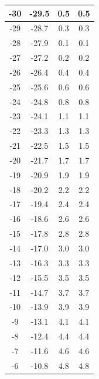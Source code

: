 \begin{longtable}{|c|c|c|c|}
                -30 & -29.5 & 0.5 & 0.5 \\
                \hline
                -29 & -28.7 & 0.3 & 0.3 \\
                \hline
                -28 & -27.9 & 0.1 & 0.1 \\
                \hline
                -27 & -27.2 & 0.2 & 0.2 \\
                \hline
                -26 & -26.4 & 0.4 & 0.4 \\
                \hline
                -25 & -25.6 & 0.6 & 0.6 \\
                \hline
                -24 & -24.8 & 0.8 & 0.8 \\
                \hline
                -23 & -24.1 & 1.1 & 1.1 \\
                \hline
                -22 & -23.3 & 1.3 & 1.3 \\
                \hline
                -21 & -22.5 & 1.5 & 1.5 \\
                \hline
                -20 & -21.7 & 1.7 & 1.7 \\
                \hline
                -19 & -20.9 & 1.9 & 1.9 \\
                \hline
                -18 & -20.2 & 2.2 & 2.2 \\
                \hline
                -17 & -19.4 & 2.4 & 2.4 \\
                \hline
                -16 & -18.6 & 2.6 & 2.6 \\
                \hline
                -15 & -17.8 & 2.8 & 2.8 \\
                \hline
                -14 & -17.0 & 3.0 & 3.0 \\
                \hline
                -13 & -16.3 & 3.3 & 3.3 \\
                \hline
                -12 & -15.5 & 3.5 & 3.5 \\
                \hline
                -11 & -14.7 & 3.7 & 3.7 \\
                \hline
                -10 & -13.9 & 3.9 & 3.9 \\
                \hline
                -9 & -13.1 & 4.1 & 4.1 \\
                \hline
                -8 & -12.4 & 4.4 & 4.4 \\
                \hline
                -7 & -11.6 & 4.6 & 4.6 \\
                \hline
                -6 & -10.8 & 4.8 & 4.8 \\

\end{longtable}

